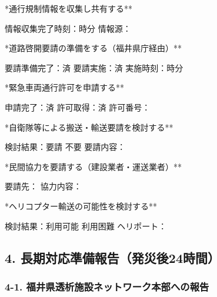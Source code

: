 \documentclass[
  japanese,
  letterpaper,
  DIV=11,
  numbers=noendperiod]{scrartcl}
\begin{document}
\checkbox **通行規制情報を収集し共有する**

\quad 情報収集完了時刻：\underlinespace{1cm}時\underlinespace{1cm}分
\quad 情報源：\underlinespace{6cm}

\vspace{3mm}

\checkbox **道路啓開要請の準備をする（福井県庁経由）**

\quad 要請準備完了：\checkbox 済 \quad 要請実施：\checkbox 済
\quad 実施時刻：\underlinespace{1cm}時\underlinespace{1cm}分

\vspace{3mm}

\checkbox **緊急車両通行許可を申請する**

\quad 申請完了：\checkbox 済 \quad 許可取得：\checkbox 済
\quad 許可番号：\underlinespace{6cm}

\newpage

\checkbox **自衛隊等による搬送・輸送要請を検討する**

\quad 検討結果：\checkbox 要請 \checkbox 不要
\quad 要請内容：\underlinespace{8cm}

\vspace{3mm}

\checkbox **民間協力を要請する（建設業者・運送業者）**

\quad 要請先：\underlinespace{8cm} \quad 協力内容：\underlinespace{6cm}

\vspace{3mm}

\checkbox **ヘリコプター輸送の可能性を検討する**

\quad 検討結果：\checkbox 利用可能 \checkbox 利用困難
\quad ヘリポート：\underlinespace{6cm}

\vspace{10mm}

\subsection{4.
長期対応準備報告（発災後24時間）}\label{ux9577ux671fux5bfeux5fdcux6e96ux5099ux5831ux544aux767aux707dux5f8c24ux6642ux9593}

\subsubsection{4-1.
福井県透析施設ネットワーク本部への報告}\label{ux798fux4e95ux770cux900fux6790ux65bdux8a2dux30cdux30c3ux30c8ux30efux30fcux30afux672cux90e8ux3078ux306eux5831ux544a}
\end{document}
